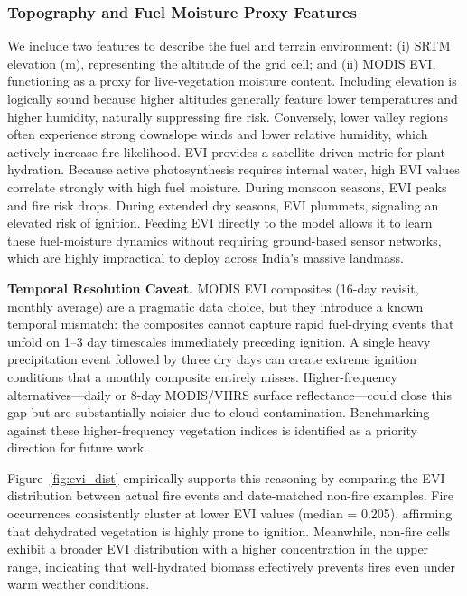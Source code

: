 \subsubsection{Topography and Fuel Moisture Proxy Features}

We include two features to describe the fuel and terrain environment: (i) SRTM elevation (m), representing the altitude of the grid cell; and (ii) MODIS EVI, functioning as a proxy for live-vegetation moisture content. Including elevation is logically sound because higher altitudes generally feature lower temperatures and higher humidity, naturally suppressing fire risk. Conversely, lower valley regions often experience strong downslope winds and lower relative humidity, which actively increase fire likelihood. EVI provides a satellite-driven metric for plant hydration. Because active photosynthesis requires internal water, high EVI values correlate strongly with high fuel moisture. During monsoon seasons, EVI peaks and fire risk drops. During extended dry seasons, EVI plummets, signaling an elevated risk of ignition. Feeding EVI directly to the model allows it to learn these fuel-moisture dynamics without requiring ground-based sensor networks, which are highly impractical to deploy across India's massive landmass.

\medskip
\noindent\textbf{Temporal Resolution Caveat.} MODIS EVI composites (16-day revisit, monthly average) are a pragmatic data choice, but they introduce a known temporal mismatch: the composites cannot capture rapid fuel-drying events that unfold on 1--3 day timescales immediately preceding ignition. A single heavy precipitation event followed by three dry days can create extreme ignition conditions that a monthly composite entirely misses. Higher-frequency alternatives---daily or 8-day MODIS/VIIRS surface reflectance---could close this gap but are substantially noisier due to cloud contamination. Benchmarking against these higher-frequency vegetation indices is identified as a priority direction for future work.

Figure~\ref{fig:evi_dist} empirically supports this reasoning by comparing the EVI distribution between actual fire events and date-matched non-fire examples. Fire occurrences consistently cluster at lower EVI values (median = 0.205), affirming that dehydrated vegetation is highly prone to ignition. Meanwhile, non-fire cells exhibit a broader EVI distribution with a higher concentration in the upper range, indicating that well-hydrated biomass effectively prevents fires even under warm weather conditions.

